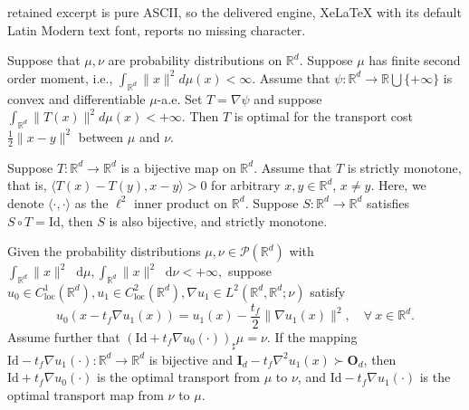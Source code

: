 \documentclass[10pt,a4paper]{amsart}
\newcommand*\diff{\mathop{}\!\mathrm{d}}
\begin{document}
retained excerpt is pure ASCII, so the delivered engine, XeLaTeX with its default Latin Modern text font, reports no missing character.
\begin{lemma}\label{lemma:sufficient_cond_for_OT} 
  Suppose that $\mu, \nu$ are probability distributions on $\mathbb{R}^d$. Suppose $\mu$ has finite second order moment, i.e.,  $\int_{\mathbb{R}^d} \|x\|^2 d\mu(x) < \infty$. Assume that $\psi:\mathbb{R}^d \rightarrow \mathbb{R}\bigcup \{+\infty \}$ is convex and differentiable $\mu$-a.e. Set $T = \nabla \psi$ and suppose $\int_{\mathbb{R}^d} \|T(x)\|^2 d\mu(x) < + \infty$. Then $T$ is optimal for the transport cost $\frac12 \|x - y\|^2$ between $\mu$ and $\nu$. 
\end{lemma}

\begin{lemma}\label{lemma:mono_map}
  Suppose $T:\mathbb{R}^d\rightarrow\mathbb{R}^d$ is a bijective map on $\mathbb{R}^d$. Assume that $T$ is strictly monotone, that is, $\langle T(x) - T(y), x-y \rangle > 0$ for arbitrary $x, y\in\mathbb{R}^d$, $x\neq y$. Here, we denote $\langle\cdot, \cdot \rangle$ as the $\ell^2$ inner product on $\mathbb{R}^d$. Suppose $S:\mathbb{R}^d\rightarrow \mathbb{R}^d$ satisfies $S\circ T = \mathrm{Id}$, then $S$ is also bijective, and strictly monotone.
\end{lemma}

\begin{theorem}\label{thm:main}
  Given the probability distributions $\mu, \nu \in \mathscr{P}(\mathbb{R}^d)$ with $\int_{\mathbb{R}^d}\|x\|^2\diff \mu, \int_{\mathbb{R}^d}\|x\|^2\diff \nu < +\infty,$ 
  suppose $u_0 \in C^1_{\text{loc}}(\mathbb{R}^d), u_1 \in C^2_{\text{loc}}(\mathbb{R}^d), \nabla u_1 \in L^2(\mathbb{R}^d, \mathbb{R}^d; \nu)$ satisfy
  \begin{equation}
    u_0(x-t_f\nabla u_1(x)) = u_1(x) - \frac{t_f}{2}\|\nabla u_1(x)\|^2, \quad \forall \ x\in\mathbb{R}^d.  \label{implicit_equ_at_T}
  \end{equation}
  Assume further that $(\mathrm{Id} + t_f\nabla u_0(\cdot))_\sharp\mu = \nu$. If the mapping $\mathrm{Id} - t_f\nabla u_1(\cdot):\mathbb{R}^d \rightarrow \mathbb{R}^d$ is bijective and $\textbf{I}_d - t_f\nabla^2 u_1(x)\succ \textbf{O}_d$, then $\mathrm{Id} + t_f \nabla u_0(\cdot)$ is the optimal transport from $\mu$ to $\nu$, and $\mathrm{Id} - t_f \nabla u_1(\cdot)$ is the optimal transport map from $\nu$ to $\mu$.
\end{theorem}
\end{document}
